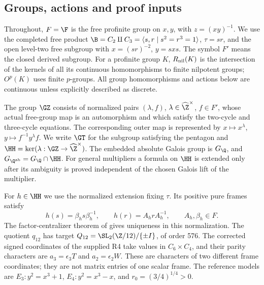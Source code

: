 \subsection*{Groups, actions and proof inputs}
Throughout, $F=\F$ is the free profinite group on $x,y$, with
$z=(xy)^{-1}$. We use the completed free product
$\B=C_2\amalg C_3=\langle s,r\mid s^2=r^3=1\rangle$,
$\tau=sr$, and the open level-two free subgroup with
$x=(sr)^{-2}$, $y=sxs$. The symbol $F'$ means the closed derived
subgroup. For a profinite group $K$, $R_{\rm nil}(K)$ is the
intersection of the kernels of all its continuous homomorphisms
to finite nilpotent groups; $O^p(K)$ uses finite $p$-groups.
All group homomorphisms and actions below are continuous unless
explicitly described as discrete.

The group $\GZ$ consists of normalized pairs $(\lambda,f)$,
$\lambda\in\widehat\Z^\times$, $f\in F'$, whose actual
free-group map is an automorphism and which satisfy the two-cycle
and three-cycle equations. The corresponding outer map is represented by
$x\mapsto x^\lambda$, $y\mapsto f^{-1}y^\lambda f$.
We write $\GT$ for the subgroup satisfying the pentagon and
$\HH=\ker(\lambda:\GZ\to\widehat\Z^\times)$.
The embedded absolute Galois group is $G_{\Q}$, and
$G_{\Q^{\rm ab}}=G_{\Q}\cap\HH$. For general multipliers a
formula on $\HH$ is extended only after its ambiguity is proved
independent of the chosen Galois lift of the multiplier.

For $h\in\HH$ we use the normalized extension fixing $\tau$.
Its positive pure frames satisfy
\[
 h(s)=\beta_hs\beta_h^{-1},\qquad
 h(r)=A_hrA_h^{-1},\qquad A_h,\beta_h\in F.
\]
The factor-centralizer theorem of
\citet[Theorem B$'$]{HerfortRibes1985} gives uniqueness in this
normalization. The quotient $q_{12}$ has target
$Q_{12}=\SL_2(\Z/12)/\{\pm I\}$, of order 576.
The corrected signed coordinates of the supplied R4 take values
in $C_6\times C_4$, and their parity characters are
$a_3=\epsilon_3T$ and $a_2=\epsilon_2W$. These are characters
of two different frame coordinates; they are not matrix entries
of one scalar frame. The reference models are
$E_3:y^2=x^3+1$, $E_4:y^2=x^3-x$, and
$r_0=(3/4)^{1/4}>0$.

